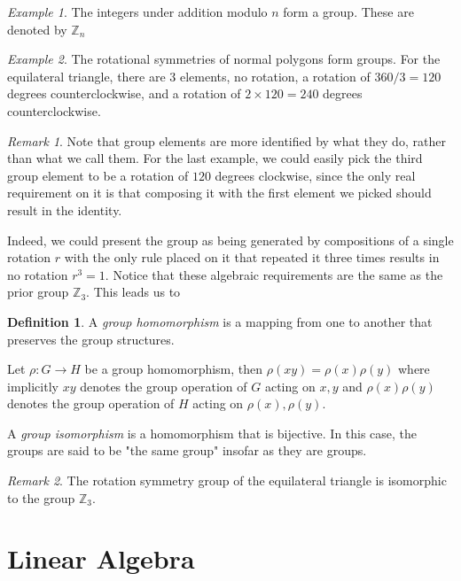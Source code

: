 \documentclass[12pt]{article}
\theoremstyle{definition}
\newtheorem{definition}{Definition}[section]
\theoremstyle{remark}
\newtheorem*{remark}{Remark}
\theoremstyle{example}
\newtheorem{example}{Example}
\theoremstyle{theorem}
\theoremstyle{lemma}
\begin{document}
\begin{example}
	The integers under addition modulo $n$ form a group. These are denoted by $\mathbb{Z}_n$
\end{example}

\begin{example}
	The rotational symmetries of normal polygons form groups. For the equilateral triangle, there are $3$ elements, no rotation, a rotation of $360/3=120$ degrees counterclockwise, and a rotation of $2\times 120=240$ degrees counterclockwise.
\end{example}
\begin{remark}
	Note that group elements are more identified by what they do, rather than what we call them. For the last example, we could easily pick the third group element to be a rotation of $120$ degrees clockwise, since the only real requirement on it is that composing it with the first element we picked should result in the identity.
	
	Indeed, we could present the group as being generated by compositions of a single rotation $r$ with the only rule placed on it that repeated it three times results in no rotation $r^3 = 1$. Notice that these algebraic requirements are the same as the prior group $\mathbb{Z}_3$. This leads us to
\end{remark}

\begin{definition}
	A \textit{group homomorphism} is a mapping from one to another that preserves the group structures.
	
	Let $\rho:G\to H$ be a group homomorphism, then $\rho(xy)=\rho(x)\rho(y)$ where implicitly $xy$ denotes the group operation of $G$ acting on $x,y$ and $\rho(x)\rho(y)$ denotes the group operation of $H$ acting on $\rho(x),\rho(y)$.
	
	A \textit{group isomorphism} is a homomorphism that is bijective. In this case, the groups are said to be "the same group" insofar as they are groups.
\end{definition}

\begin{remark}
	The rotation symmetry group of the equilateral triangle is isomorphic to the group $\mathbb{Z}_3$.
\end{remark}

\section{Linear Algebra}
\end{document}
